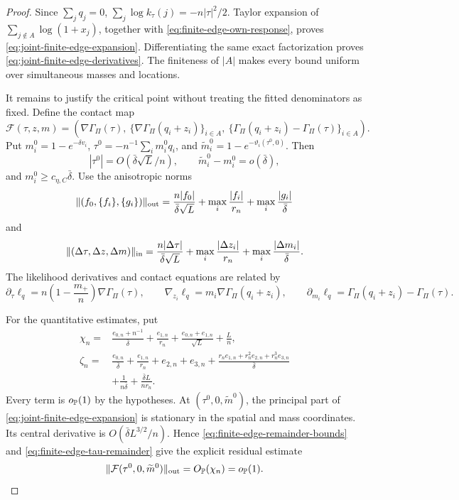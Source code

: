 \begin{proof}
Since \(\sum_jq_j=0\),
\(\sum_j\log k_\tau(j)=-n|\tau|^2/2\).  Taylor expansion of
\(\sum_{j\notin A}\log(1+x_j)\), together with
\eqref{eq:finite-edge-own-response}, proves
\eqref{eq:joint-finite-edge-expansion}.  Differentiating the same exact
factorization proves \eqref{eq:joint-finite-edge-derivatives}.  The
finiteness of \(|A|\) makes every bound uniform over simultaneous masses
and locations.

It remains to justify the critical point without treating the fitted
denominators as fixed.  Define the contact map
\[
 \mathcal F(\tau,z,m)
 =
 \left(
  \nabla\Gamma_\Pi(\tau),\
  \{\nabla\Gamma_\Pi(q_i+z_i)\}_{i\in A},\
  \{\Gamma_\Pi(q_i+z_i)-\Gamma_\Pi(\tau)\}_{i\in A}
 \right).
\]
Put \(m_i^0=1-e^{-\delta v_i}\),
\(\tau^0=-n^{-1}\sum_i m_i^0q_i\), and
\(\widetilde m_i^0=1-e^{-\vartheta_i(\tau^0,0)}\).  Then
\[
 |\tau^0|=O(\bar\delta\sqrt L/n),\qquad
 \widetilde m_i^0-m_i^0=o(\bar\delta),
\]
and \(m_i^0\ge c_{\eta,C}\bar\delta\).  Use the anisotropic norms
\[
 \|(f_0,\{f_i\},\{g_i\})\|_{\rm out}
 =
 \frac{n|f_0|}{\bar\delta\sqrt L}
 +\max_i\frac{|f_i|}{r_n}
 +\max_i\frac{|g_i|}{\bar\delta}
\]
and
\[
 \|(\Delta\tau,\Delta z,\Delta m)\|_{\rm in}
 =
 \frac{n|\Delta\tau|}{\bar\delta\sqrt L}
 +\max_i\frac{|\Delta z_i|}{r_n}
 +\max_i\frac{|\Delta m_i|}{\bar\delta}.
\]
The likelihood derivatives and contact equations are related by
\[
 \partial_\tau\ell_q
 =n\left(1-\frac{m_+}{n}\right)\nabla\Gamma_\Pi(\tau),
 \qquad
 \nabla_{z_i}\ell_q=m_i\nabla\Gamma_\Pi(q_i+z_i),
 \qquad
 \partial_{m_i}\ell_q
 =\Gamma_\Pi(q_i+z_i)-\Gamma_\Pi(\tau).
\]

For the quantitative estimates, put
\[
 \begin{split}
 \chi_n={}&
 \frac{e_{0,n}+n^{-1}}{\bar\delta}
 +\frac{e_{1,n}}{r_n}
 +\frac{e_{0,n}+e_{1,n}}{\sqrt L}
 +\frac Ln,\\
 \zeta_n={}&
 \frac{e_{0,n}}{\bar\delta}
 +\frac{e_{1,n}}{r_n}+e_{2,n}+e_{3,n}
 +\frac{r_ne_{1,n}+r_n^2e_{2,n}+r_n^3e_{3,n}}{\bar\delta}\\
 &+\frac1{n\bar\delta}+\frac{\bar\delta L}{nr_n}.
 \end{split}
\]
Every term is \(o_{\mathbb P}(1)\) by the hypotheses.  At
\((\tau^0,0,\widetilde m^0)\), the principal part of
\eqref{eq:joint-finite-edge-expansion} is stationary in the spatial and
mass coordinates.  Its central derivative is
\(O(\bar\delta L^{3/2}/n)\).  Hence
\eqref{eq:finite-edge-remainder-bounds} and
\eqref{eq:finite-edge-tau-remainder} give the explicit residual estimate
\begin{equation}
\label{eq:finite-edge-scaled-residual}
 \|\mathcal F(\tau^0,0,\widetilde m^0)\|_{\rm out}
 =O_{\mathbb P}(\chi_n)=o_{\mathbb P}(1).
\end{equation}


\end{proof}
